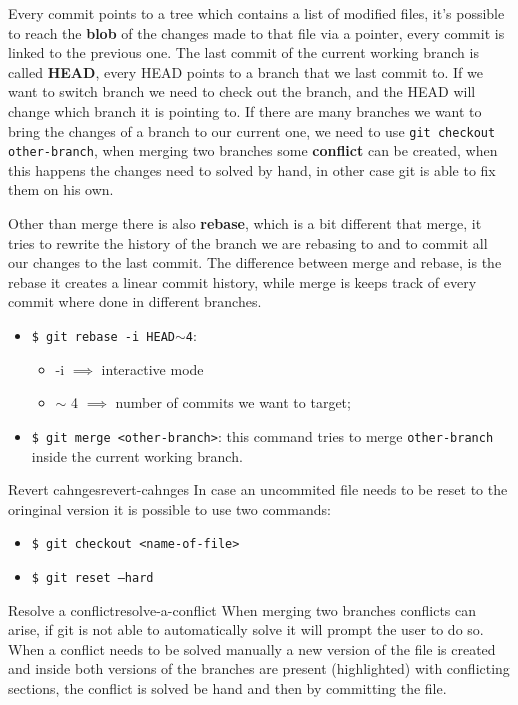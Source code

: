 \documentclass[12pt]{article}
\begin{document}
Every commit points to a tree which contains a list of modified files, it's possible to reach the \textbf{blob} of the changes made to that file via a pointer, every commit is linked to the previous one. The last commit of the current working branch is called \textbf{HEAD}, every HEAD points to a branch that we last commit to. If we want to switch branch we need to check out the branch, and the HEAD will change which branch it is pointing to. If there are many branches we want to bring the changes of a branch to our current one, we need to use \texttt{git checkout other-branch}, when merging two branches some \textbf{conflict} can be created, when this happens the changes need to solved by hand, in other case git is able to fix them on his own.

Other than merge there is also \textbf{rebase}, which is a bit different that merge, it tries to rewrite the history of the branch we are rebasing to and to commit all our changes to the last commit. The difference between merge and rebase, is the rebase it creates a linear commit history, while merge is keeps track of every commit where done in different branches.
\begin{itemize}
  \item \texttt{\$ git rebase -i HEAD$\sim$4}:
    \begin{itemize}
      \item -i $ \implies$ interactive mode
      \item $\sim$ 4 $ \implies$ number of commits we want to target;
    \end{itemize}
  \item \texttt{\$ git merge <other-branch>}: this command tries to merge \texttt{other-branch} inside the current working branch.
\end{itemize}
\begin{example}{Revert cahnges}{revert-cahnges}
  In case an uncommited file needs to be reset to the oringinal version it is possible to use two commands:
  \begin{itemize}
    \item \texttt{\$ git checkout <name-of-file>}
    \item \texttt{\$ git reset --hard}
  \end{itemize}
\end{example}
\begin{example}{Resolve a conflict}{resolve-a-conflict}
  When merging two branches conflicts can arise, if git is not able to automatically solve it will prompt the user to do so. When a conflict needs to be solved manually a new version of the file is created and inside both versions of the branches are present (highlighted) with conflicting sections, the conflict is solved be hand and then by committing the file.
\end{example}
\end{document}

